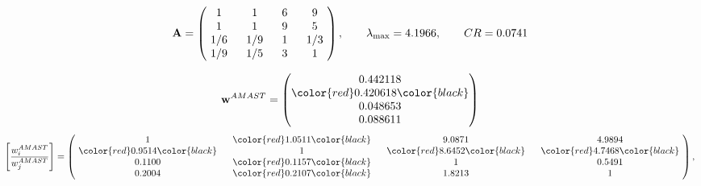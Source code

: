 \begin{example}
\begin{equation*}
\mathbf{A} =
\begin{pmatrix}
$\,\,$ 1 $\,\,$ & $\,\,$1$\,\,$ & $\,\,$6$\,\,$ & $\,\,$9 $\,\,$ \\
$\,\,$ 1 $\,\,$ & $\,\,$ 1 $\,\,$ & $\,\,$9$\,\,$ & $\,\,$5 $\,\,$ \\
$\,\,$ 1/6$\,\,$ & $\,\,$ 1/9$\,\,$ & $\,\,$ 1 $\,\,$ & $\,\,$ 1/3 $\,\,$ \\
$\,\,$ 1/9$\,\,$ & $\,\,$ 1/5$\,\,$ & $\,\,$3$\,\,$ & $\,\,$ 1  $\,\,$ \\
\end{pmatrix},
\qquad
\lambda_{\max} =
4.1966,
\qquad
CR = 0.0741
\end{equation*}

\begin{equation*}
\mathbf{w}^{AMAST} =
\begin{pmatrix}
0.442118\\
\color{red} 0.420618\color{black} \\
0.048653\\
0.088611
\end{pmatrix}\end{equation*}
\begin{equation*}
\left[ \frac{{w}^{AMAST}_i}{{w}^{AMAST}_j} \right] =
\begin{pmatrix}
$\,\,$ 1 $\,\,$ & $\,\,$\color{red} 1.0511\color{black} $\,\,$ & $\,\,$9.0871$\,\,$ & $\,\,$4.9894$\,\,$ \\
$\,\,$\color{red} 0.9514\color{black} $\,\,$ & $\,\,$ 1 $\,\,$ & $\,\,$\color{red} 8.6452\color{black} $\,\,$ & $\,\,$\color{red} 4.7468\color{black}   $\,\,$ \\
$\,\,$0.1100$\,\,$ & $\,\,$\color{red} 0.1157\color{black} $\,\,$ & $\,\,$ 1 $\,\,$ & $\,\,$0.5491 $\,\,$ \\
$\,\,$0.2004$\,\,$ & $\,\,$\color{red} 0.2107\color{black} $\,\,$ & $\,\,$1.8213$\,\,$ & $\,\,$ 1  $\,\,$ \\
\end{pmatrix},
\end{equation*}


\end{example}
